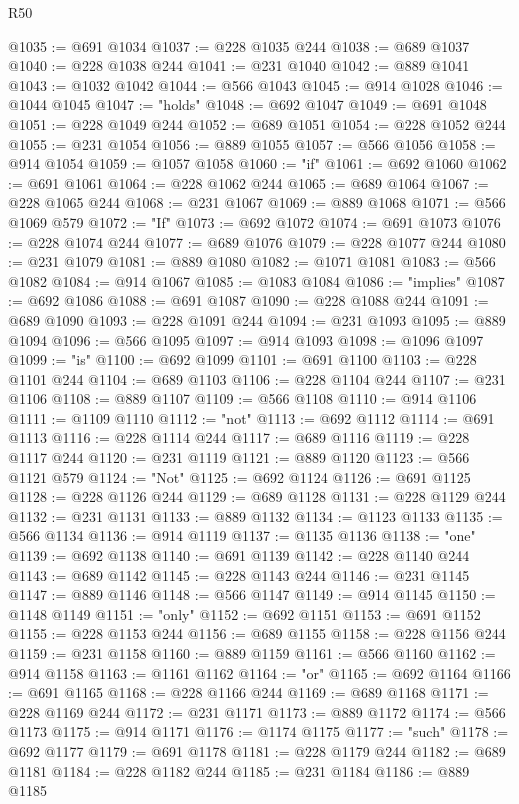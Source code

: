 \begin{lexlean}{R50}
\begin{coremodule}
@1035 := @691 @1034
@1037 := @228 @1035 @244
@1038 := @689 @1037
@1040 := @228 @1038 @244
@1041 := @231 @1040
@1042 := @889 @1041
@1043 := @1032 @1042
@1044 := @566 @1043
@1045 := @914 @1028
@1046 := @1044 @1045
@1047 := "holds"
@1048 := @692 @1047
@1049 := @691 @1048
@1051 := @228 @1049 @244
@1052 := @689 @1051
@1054 := @228 @1052 @244
@1055 := @231 @1054
@1056 := @889 @1055
@1057 := @566 @1056
@1058 := @914 @1054
@1059 := @1057 @1058
@1060 := "if"
@1061 := @692 @1060
@1062 := @691 @1061
@1064 := @228 @1062 @244
@1065 := @689 @1064
@1067 := @228 @1065 @244
@1068 := @231 @1067
@1069 := @889 @1068
@1071 := @566 @1069 @579
@1072 := "If"
@1073 := @692 @1072
@1074 := @691 @1073
@1076 := @228 @1074 @244
@1077 := @689 @1076
@1079 := @228 @1077 @244
@1080 := @231 @1079
@1081 := @889 @1080
@1082 := @1071 @1081
@1083 := @566 @1082
@1084 := @914 @1067
@1085 := @1083 @1084
@1086 := "implies"
@1087 := @692 @1086
@1088 := @691 @1087
@1090 := @228 @1088 @244
@1091 := @689 @1090
@1093 := @228 @1091 @244
@1094 := @231 @1093
@1095 := @889 @1094
@1096 := @566 @1095
@1097 := @914 @1093
@1098 := @1096 @1097
@1099 := "is"
@1100 := @692 @1099
@1101 := @691 @1100
@1103 := @228 @1101 @244
@1104 := @689 @1103
@1106 := @228 @1104 @244
@1107 := @231 @1106
@1108 := @889 @1107
@1109 := @566 @1108
@1110 := @914 @1106
@1111 := @1109 @1110
@1112 := "not"
@1113 := @692 @1112
@1114 := @691 @1113
@1116 := @228 @1114 @244
@1117 := @689 @1116
@1119 := @228 @1117 @244
@1120 := @231 @1119
@1121 := @889 @1120
@1123 := @566 @1121 @579
@1124 := "Not"
@1125 := @692 @1124
@1126 := @691 @1125
@1128 := @228 @1126 @244
@1129 := @689 @1128
@1131 := @228 @1129 @244
@1132 := @231 @1131
@1133 := @889 @1132
@1134 := @1123 @1133
@1135 := @566 @1134
@1136 := @914 @1119
@1137 := @1135 @1136
@1138 := "one"
@1139 := @692 @1138
@1140 := @691 @1139
@1142 := @228 @1140 @244
@1143 := @689 @1142
@1145 := @228 @1143 @244
@1146 := @231 @1145
@1147 := @889 @1146
@1148 := @566 @1147
@1149 := @914 @1145
@1150 := @1148 @1149
@1151 := "only"
@1152 := @692 @1151
@1153 := @691 @1152
@1155 := @228 @1153 @244
@1156 := @689 @1155
@1158 := @228 @1156 @244
@1159 := @231 @1158
@1160 := @889 @1159
@1161 := @566 @1160
@1162 := @914 @1158
@1163 := @1161 @1162
@1164 := "or"
@1165 := @692 @1164
@1166 := @691 @1165
@1168 := @228 @1166 @244
@1169 := @689 @1168
@1171 := @228 @1169 @244
@1172 := @231 @1171
@1173 := @889 @1172
@1174 := @566 @1173
@1175 := @914 @1171
@1176 := @1174 @1175
@1177 := "such"
@1178 := @692 @1177
@1179 := @691 @1178
@1181 := @228 @1179 @244
@1182 := @689 @1181
@1184 := @228 @1182 @244
@1185 := @231 @1184
@1186 := @889 @1185

\end{coremodule}
\end{lexlean}
